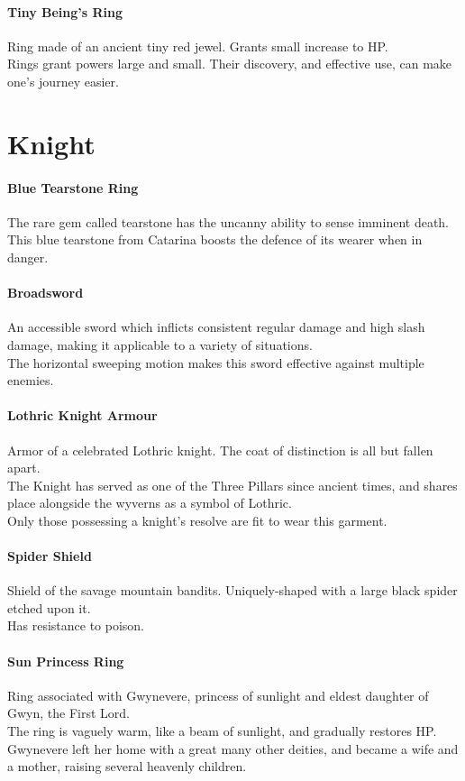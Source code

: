 \documentclass[twocolumn,a4paper]{article}
\begin{document}
\paragraph{Tiny Being's Ring}
Ring made of an ancient tiny red jewel. Grants small increase to HP.\\
Rings grant powers large and small. Their discovery, and effective use, can make one's journey easier.
\section*{Knight}
\paragraph{Blue Tearstone Ring}
The rare gem called tearstone has the uncanny ability to sense imminent death.\\
This blue tearstone from Catarina boosts the defence of its wearer when in danger.
\paragraph{Broadsword}
An accessible sword which inflicts consistent regular damage and high slash damage, making it applicable to a variety of situations.\\
The horizontal sweeping motion makes this sword effective against multiple enemies.
\paragraph{Lothric Knight Armour}
Armor of a celebrated Lothric knight.
The coat of distinction is all but fallen apart.\\
The Knight has served as one of the Three Pillars since ancient times, and shares place alongside the wyverns as a symbol of Lothric.\\
Only those possessing a knight's resolve are fit to wear this garment.
\paragraph{Spider Shield}
Shield of the savage mountain bandits. Uniquely-shaped with a large black spider etched upon it.\\
Has resistance to poison.
\paragraph{Sun Princess Ring}
Ring associated with Gwynevere, princess of sunlight and eldest daughter of Gwyn, the First Lord.\\
The ring is vaguely warm, like a beam of sunlight, and gradually restores HP.\\
Gwynevere left her home with a great many other deities, and became a wife and a mother, raising several heavenly children.
\end{document}
